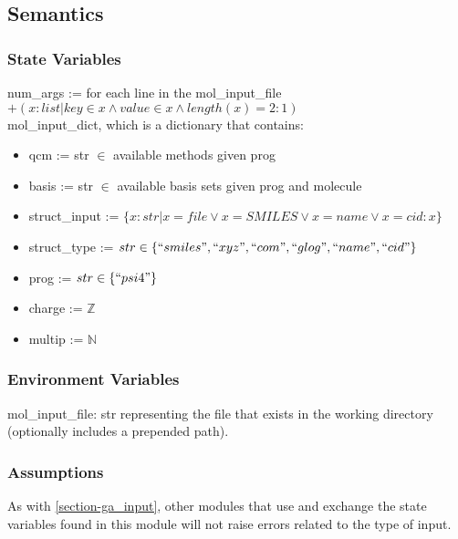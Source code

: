 \documentclass[12pt, titlepage]{article}
\begin{document}
\subsection{Semantics}

\subsubsection{State Variables}

\noindent num\_args := for each line in the mol\_input\_file $+(x : list | key 
\in x \land value \in x \land 
length(x) = 2 : 1)$ \\

\noindent mol\_input\_dict, which is a dictionary that contains:
\begin{itemize}
	\item qcm := str $\in$ available methods given prog
	\item basis := str $\in$ available basis sets given prog and molecule
	\item struct\_input := $\{x : str | x = file \lor x = SMILES \lor x = name 
	\lor x = cid : x\}$
	\item struct\_type := $str \in \{``smiles", ``xyz", ``com", ``glog", 
	``name", ``cid"\} $
	\item prog := $str \in \{``psi4"\}$
	\item charge := $\mathbb{Z}$
	\item multip := $\mathbb{N}$
\end{itemize}


\subsubsection{Environment Variables}

mol\_input\_file: str representing the file that exists in the working 
directory (optionally includes a prepended path).

\subsubsection{Assumptions}

As with \ref{section-ga_input}, other modules that use and exchange the state 
variables found in this module will not raise errors related to the type of 
input.
\end{document}
